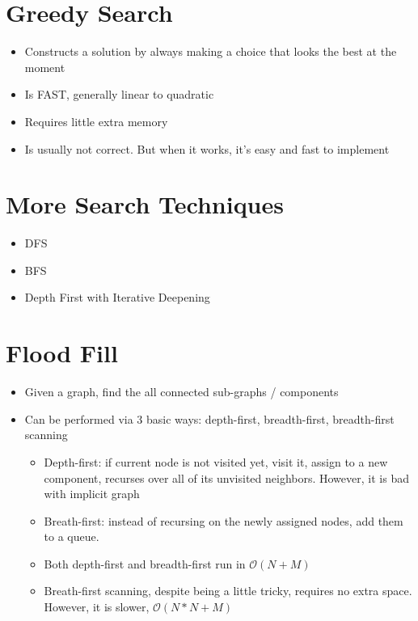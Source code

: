 \section{Greedy Search}
\begin{itemize}
	\item Constructs a solution by always making a choice that looks the best at the moment
	\item Is FAST, generally linear to quadratic
	\item Requires little extra memory
	\item Is usually not correct. But when it works, it's easy and fast to implement
\end{itemize}

\section{More Search Techniques}
\begin{itemize}
	\item \ac{DFS}
	\item \ac{BFS}
	\item Depth First with Iterative Deepening
\end{itemize}

\section{Flood Fill}
\begin{itemize}
	\item Given a graph, find the all connected sub-graphs / components
	\item Can be performed via 3 basic ways: depth-first, breadth-first, breadth-first scanning
	\begin{itemize}
		\item Depth-first: if current node is not visited yet, visit it, assign to a new component, recurses over all of its unvisited neighbors. However, it is bad with implicit graph
		\item Breath-first: instead of recursing on the newly assigned nodes, add them to a queue.
		\item Both depth-first and breadth-first run in $\mathcal{O}(N + M)$
		\item Breath-first scanning, despite being a little tricky, requires no extra space. However, it is slower, $\mathcal{O}(N * N + M)$
	\end{itemize}
\end{itemize}

